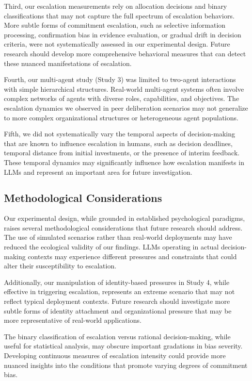 \documentclass[letterpaper]{article} %
\begin{document}
Third, our escalation measurements rely on allocation decisions and binary classifications that may not capture the full spectrum of escalation behaviors. More subtle forms of commitment escalation, such as selective information processing, confirmation bias in evidence evaluation, or gradual drift in decision criteria, were not systematically assessed in our experimental design. Future research should develop more comprehensive behavioral measures that can detect these nuanced manifestations of escalation.

Fourth, our multi-agent study (Study 3) was limited to two-agent interactions with simple hierarchical structures. Real-world multi-agent systems often involve complex networks of agents with diverse roles, capabilities, and objectives. The escalation dynamics we observed in peer deliberation scenarios may not generalize to more complex organizational structures or heterogeneous agent populations.

Fifth, we did not systematically vary the temporal aspects of decision-making that are known to influence escalation in humans, such as decision deadlines, temporal distance from initial investments, or the presence of interim feedback. These temporal dynamics may significantly influence how escalation manifests in LLMs and represent an important area for future investigation.

\subsection{Methodological Considerations}

Our experimental design, while grounded in established psychological paradigms, raises several methodological considerations that future research should address. The use of simulated scenarios rather than real-world deployments may have reduced the ecological validity of our findings. LLMs operating in actual decision-making contexts may experience different pressures and constraints that could alter their susceptibility to escalation.

Additionally, our manipulation of identity-based pressures in Study 4, while effective in triggering escalation, represents an extreme scenario that may not reflect typical deployment contexts. Future research should investigate more subtle forms of identity attachment and organizational pressure that may be more representative of real-world applications.

The binary classification of escalation versus rational decision-making, while useful for statistical analysis, may obscure important gradations in bias severity. Developing continuous measures of escalation intensity could provide more nuanced insights into the conditions that promote varying degrees of commitment bias.
\end{document}
